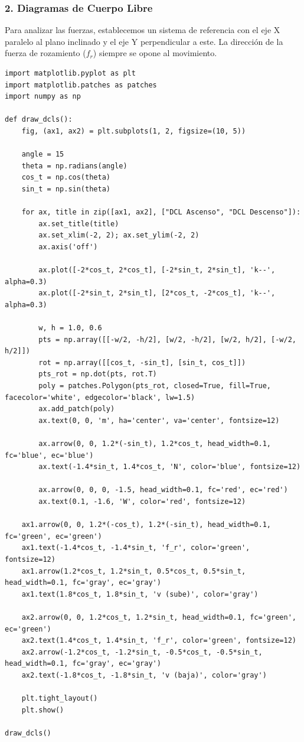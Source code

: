 \documentclass[12pt, a4paper]{article}
\begin{document}
\subsubsection*{2. Diagramas de Cuerpo Libre}
Para analizar las fuerzas, establecemos un sistema de referencia con el eje X paralelo al plano inclinado y el eje Y perpendicular a este. La dirección de la fuerza de rozamiento ($f_r$) siempre se opone al movimiento.

\begin{lstlisting}
import matplotlib.pyplot as plt
import matplotlib.patches as patches
import numpy as np

def draw_dcls():
    fig, (ax1, ax2) = plt.subplots(1, 2, figsize=(10, 5))
    
    angle = 15
    theta = np.radians(angle)
    cos_t = np.cos(theta)
    sin_t = np.sin(theta)
    
    for ax, title in zip([ax1, ax2], ["DCL Ascenso", "DCL Descenso"]):
        ax.set_title(title)
        ax.set_xlim(-2, 2); ax.set_ylim(-2, 2)
        ax.axis('off')
        
        ax.plot([-2*cos_t, 2*cos_t], [-2*sin_t, 2*sin_t], 'k--', alpha=0.3)
        ax.plot([-2*sin_t, 2*sin_t], [2*cos_t, -2*cos_t], 'k--', alpha=0.3)
        
        w, h = 1.0, 0.6
        pts = np.array([[-w/2, -h/2], [w/2, -h/2], [w/2, h/2], [-w/2, h/2]])
        rot = np.array([[cos_t, -sin_t], [sin_t, cos_t]])
        pts_rot = np.dot(pts, rot.T)
        poly = patches.Polygon(pts_rot, closed=True, fill=True, facecolor='white', edgecolor='black', lw=1.5)
        ax.add_patch(poly)
        ax.text(0, 0, 'm', ha='center', va='center', fontsize=12)
        
        ax.arrow(0, 0, 1.2*(-sin_t), 1.2*cos_t, head_width=0.1, fc='blue', ec='blue')
        ax.text(-1.4*sin_t, 1.4*cos_t, 'N', color='blue', fontsize=12)
        
        ax.arrow(0, 0, 0, -1.5, head_width=0.1, fc='red', ec='red')
        ax.text(0.1, -1.6, 'W', color='red', fontsize=12)
        
    ax1.arrow(0, 0, 1.2*(-cos_t), 1.2*(-sin_t), head_width=0.1, fc='green', ec='green')
    ax1.text(-1.4*cos_t, -1.4*sin_t, 'f_r', color='green', fontsize=12)
    ax1.arrow(1.2*cos_t, 1.2*sin_t, 0.5*cos_t, 0.5*sin_t, head_width=0.1, fc='gray', ec='gray')
    ax1.text(1.8*cos_t, 1.8*sin_t, 'v (sube)', color='gray')
    
    ax2.arrow(0, 0, 1.2*cos_t, 1.2*sin_t, head_width=0.1, fc='green', ec='green')
    ax2.text(1.4*cos_t, 1.4*sin_t, 'f_r', color='green', fontsize=12)
    ax2.arrow(-1.2*cos_t, -1.2*sin_t, -0.5*cos_t, -0.5*sin_t, head_width=0.1, fc='gray', ec='gray')
    ax2.text(-1.8*cos_t, -1.8*sin_t, 'v (baja)', color='gray')

    plt.tight_layout()
    plt.show()

draw_dcls()
\end{lstlisting}
\end{document}
